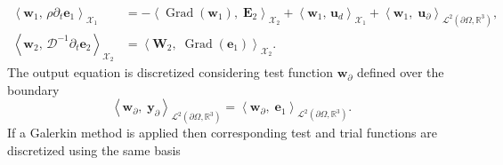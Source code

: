 \documentclass{svjour3}                     %
\DeclareMathOperator*{\Grad}{Grad}
\newcommand{\inner}[3][]{\ensuremath{\left\langle #2, \, #3 \right\rangle_{#1}}}
\newcommand{\firstRev}[1]{\textcolor{red!80!black}{#1}}
\begin{document}
\firstRev{
\begin{equation}
\begin{aligned}
\inner[\mathscr{X}_1]{\bm{w}_1}{\rho \partial_t \bm{e}_1} &=- \left\langle {\Grad} (\bm{w}_1), \; \bm{E}_2 \right\rangle_{\mathscr{X}_2} + \inner[\mathscr{X}_1]{\bm{w}_1}{\bm{u}_d}  + \left\langle \bm{w}_1, \; \bm{u}_\partial \right\rangle_{\mathscr{L}^2(\partial \Omega, \mathbb{R}^3)}, \\
\inner[\mathscr{X}_2]{\bm{w}_2}{\bm{\mathcal{D}}^{-1}\partial_t \bm{e}_2} &=\left\langle \bm{W}_2, \; {\Grad} (\bm{e}_1) \right\rangle_{\mathscr{X}_2}.
\end{aligned}
\end{equation}
}
The output equation is discretized considering test function $\bm{w}_\partial$ defined over the boundary
\begin{equation}
\left\langle \bm{w}_\partial, \; \bm{y}_\partial \right\rangle_{\mathscr{L}^2(\partial \Omega, \mathbb{R}^3)} = \left\langle \bm{w}_\partial, \; \bm{e}_1 \right\rangle_{\mathscr{L}^2(\partial \Omega, \mathbb{R}^3)}.
\end{equation}
If a Galerkin method is applied then corresponding test and trial functions are discretized using the same basis
\end{document}
